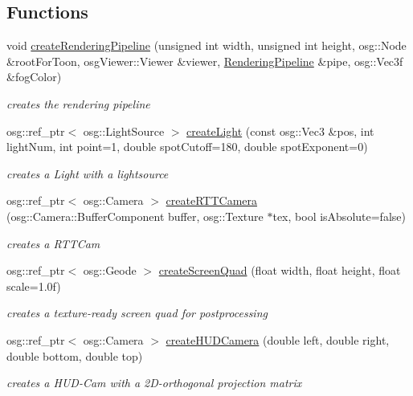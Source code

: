 \subsection*{Functions}
\begin{DoxyCompactItemize}
\item 
void \hyperlink{namespacebrtr_adcf0546a392221be3958ec96f99887f0}{create\+Rendering\+Pipeline} (unsigned int width, unsigned int height, osg\+::\+Node \&root\+For\+Toon, osg\+Viewer\+::\+Viewer \&viewer, \hyperlink{structbrtr_1_1_rendering_pipeline}{Rendering\+Pipeline} \&pipe, osg\+::\+Vec3f \&fog\+Color)
\begin{DoxyCompactList}\small\item\em creates the rendering pipeline \end{DoxyCompactList}\item 
osg\+::ref\+\_\+ptr$<$ osg\+::\+Light\+Source $>$ \hyperlink{namespacebrtr_ad772c6dbc0a2cabd40a284676c124a97}{create\+Light} (const osg\+::\+Vec3 \&pos, int light\+Num, int point=1, double spot\+Cutoff=180, double spot\+Exponent=0)
\begin{DoxyCompactList}\small\item\em creates a Light with a lightsource \end{DoxyCompactList}\item 
osg\+::ref\+\_\+ptr$<$ osg\+::\+Camera $>$ \hyperlink{namespacebrtr_aa7a89c381be095a7eb1e248d2e6c0e23}{create\+R\+T\+T\+Camera} (osg\+::\+Camera\+::\+Buffer\+Component buffer, osg\+::\+Texture $\ast$tex, bool is\+Absolute=false)
\begin{DoxyCompactList}\small\item\em creates a R\+T\+T\+Cam \end{DoxyCompactList}\item 
osg\+::ref\+\_\+ptr$<$ osg\+::\+Geode $>$ \hyperlink{namespacebrtr_a32cfc96621681baabc76c52af5d6a347}{create\+Screen\+Quad} (float width, float height, float scale=1.\+0f)
\begin{DoxyCompactList}\small\item\em creates a texture-\/ready screen quad for postprocessing \end{DoxyCompactList}\item 
osg\+::ref\+\_\+ptr$<$ osg\+::\+Camera $>$ \hyperlink{namespacebrtr_a62da4f109238c45882dd64d7a7e97a1d}{create\+H\+U\+D\+Camera} (double left, double right, double bottom, double top)
\begin{DoxyCompactList}\small\item\em creates a H\+U\+D-\/\+Cam with a 2\+D-\/orthogonal projection matrix \end{DoxyCompactList}\item 

\end{DoxyCompactItemize}
